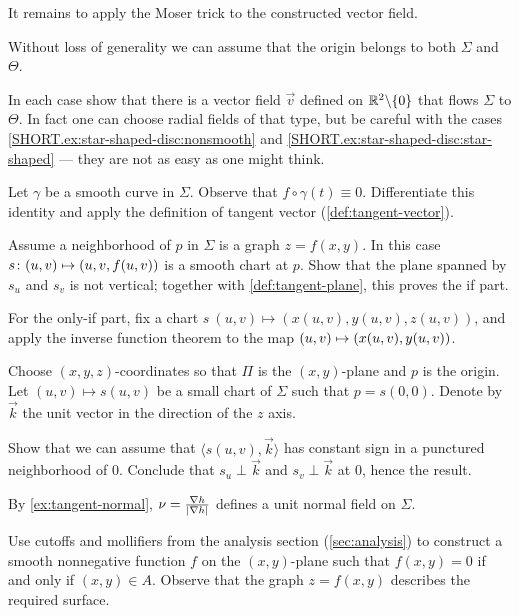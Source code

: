 It remains to apply the Moser trick to the constructed vector field. 

Without loss of generality we can assume that the origin belongs to both $\Sigma$ and~$\Theta$.

In each case show that there is a vector field $\vec v$ defined on $\mathbb{R}^2\backslash\{0\}$ that flows $\Sigma$ to $\Theta$.
In fact one can choose radial fields of that type,
but be careful with the cases \ref{SHORT.ex:star-shaped-disc:nonsmooth} and \ref{SHORT.ex:star-shaped-disc:star-shaped} --- they are not as easy as one might think.

\setcounter{eqtn}{0}

Let $\gamma$ be a smooth curve in $\Sigma$.
Observe that $f\circ\gamma(t)\equiv 0$.
Differentiate this identity and apply the definition of tangent vector (\ref{def:tangent-vector}).

Assume a neighborhood of $p$ in $\Sigma$ is a graph $z=f(x,y)$.
In this case $s\:(u,v)\z\mapsto (u,v,f(u,v))$ is a smooth chart at $p$.
Show that the plane spanned by $s_u$ and $s_v$ is not vertical;
together with \ref{def:tangent-plane}, this proves the if part.

For the only-if part, fix a chart 
$s\:(u,v)\mapsto(x(u,v),y(u,v),z(u,v))$,
and apply the inverse function theorem to the map $(u,v)\z\mapsto(x(u,v),y(u,v))$.

Choose $(x,y,z)$-coordinates so that $\Pi$ is the $(x,y)$-plane and $p$ is the origin.
Let $(u,v)\mapsto s(u,v)$ be a small chart of $\Sigma$ such that $p=s(0,0)$.
Denote by $\vec k$ the unit vector in the direction of the $z$ axis.

Show that we can assume that $\langle s(u,v),\vec k\rangle$ has constant sign in a punctured neighborhood of $0$.
Conclude that $s_u\perp \vec k$ and $s_v\perp \vec k$ at
$0$, hence the result.

 By \ref{ex:tangent-normal}, $\nu=\tfrac{\nabla h}{|\nabla h|}$ defines a unit normal field on $\Sigma$.

Use cutoffs and mollifiers from the analysis section (\ref{sec:analysis}) to construct a smooth nonnegative function $f$ on the $(x,y)$-plane such that $f(x,y)=0$ if and only if $(x,y)\in A$.
Observe that the graph $z=f(x,y)$ describes the required surface.

